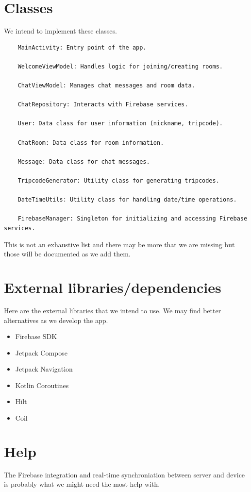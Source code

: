 \documentclass{article}
\begin{document}
\section{Classes}
We intend to implement these classes.
\begin{verbatim}
    MainActivity: Entry point of the app.
    
    WelcomeViewModel: Handles logic for joining/creating rooms.
    
    ChatViewModel: Manages chat messages and room data.
    
    ChatRepository: Interacts with Firebase services.
    
    User: Data class for user information (nickname, tripcode).
    
    ChatRoom: Data class for room information.
    
    Message: Data class for chat messages.
    
    TripcodeGenerator: Utility class for generating tripcodes.
    
    DateTimeUtils: Utility class for handling date/time operations.
    
    FirebaseManager: Singleton for initializing and accessing Firebase services.
    \end{verbatim}
This is not an exhaustive list and there may be more that we are missing but those will be documented as we add them.

\newpage
\section{External libraries/dependencies}
Here are the external libraries that we intend to use. We may find better alternatives as we develop the app.

\begin{itemize}
    \item Firebase SDK
    \item Jetpack Compose
    \item Jetpack Navigation
    \item Kotlin Coroutines
    \item Hilt
    \item Coil
\end{itemize}

\section{Help}
The Firebase integration and real-time synchroniation between server and device is probably what we might need the most help with.
\end{document}
